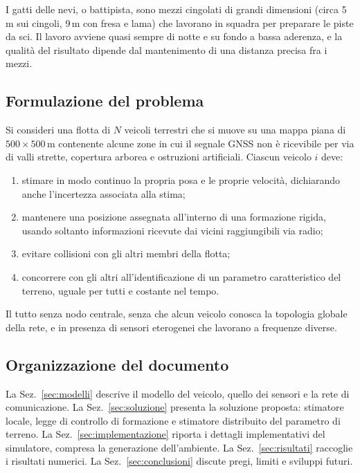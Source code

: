\documentclass[conference,9pt]{IEEEtran}
\begin{document}
I gatti delle nevi, o battipista, sono mezzi cingolati di grandi dimensioni
(circa 5\,m sui cingoli, 9\,m con fresa e lama) che lavorano in squadra per
preparare le piste da sci. Il lavoro avviene quasi sempre di notte e su fondo
a bassa aderenza, e la qualit\`a del risultato dipende dal mantenimento di
una distanza precisa fra i mezzi.

\subsection{Formulazione del problema}

Si consideri una flotta di $N$ veicoli terrestri che si muove su una mappa
piana di $500 \times 500$\,m contenente alcune zone in cui il segnale GNSS non
\`e ricevibile per via di valli strette, copertura arborea e ostruzioni
artificiali. Ciascun veicolo $i$ deve:

\begin{enumerate}
\item stimare in modo continuo la propria posa e le proprie velocit\`a,
      dichiarando anche l'incertezza associata alla stima;
\item mantenere una posizione assegnata all'interno di una formazione rigida,
      usando soltanto informazioni ricevute dai vicini raggiungibili via radio;
\item evitare collisioni con gli altri membri della flotta;
\item concorrere con gli altri all'identificazione di un parametro
      caratteristico del terreno, uguale per tutti e costante nel tempo.
\end{enumerate}

Il tutto senza nodo centrale, senza che alcun veicolo conosca la topologia
globale della rete, e in presenza di sensori eterogenei che lavorano a
frequenze diverse.

\subsection{Organizzazione del documento}

La Sez.~\ref{sec:modelli} descrive il modello del veicolo, quello dei sensori e
la rete di comunicazione. La Sez.~\ref{sec:soluzione} presenta la soluzione
proposta: stimatore locale, legge di controllo di formazione e stimatore
distribuito del parametro di terreno. La Sez.~\ref{sec:implementazione} riporta
i dettagli implementativi del simulatore, compresa la generazione dell'ambiente.
La Sez.~\ref{sec:risultati} raccoglie i risultati numerici. La
Sez.~\ref{sec:conclusioni} discute pregi, limiti e sviluppi futuri.
\end{document}
